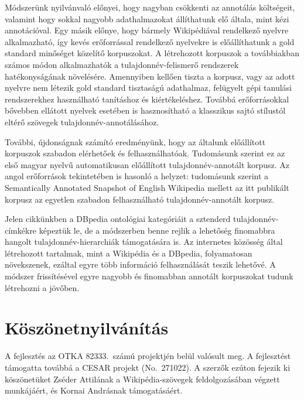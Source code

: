 \documentclass{llncs}
\begin{document}
Módszerünk nyilvánvaló előnyei, hogy nagyban csökkenti az annotálás költségeit, valamint hogy sokkal nagyobb adathalmazokat állíthatunk elő általa, mint kézi annotációval. Egy másik előnye, hogy bármely Wikipédiával rendelkező nyelvre alkalmazható, így kevés erőforrással rendelkező nyelvekre is előállíthatunk a gold standard minőséget közelítő korpuszokat. A létrehozott korpuszok a továbbiakban számos módon alkalmazhatók a tulajdonnév-felismerő rendszerek hatékonyságának növelésére. Amennyiben kellően tiszta a korpusz, vagy az adott nyelvre nem létezik gold standard tisztaságú adathalmaz, felügyelt gépi tanulási rendszerekhez használható tanításhoz és kiértékeléshez. Továbbá erőforrásokkal bővebben ellátott nyelvek esetében is hasznosítható a klasszikus sajtó stílustól eltérő szövegek tulajdonnév-annotálásához. 

További, újdonságnak számító eredményünk, hogy az általunk előállított korpuszok szabadon elérhetőek és felhasználhatóak. Tudomásunk szerint ez az első magyar nyelvű automatikusan előállított tulajdonnév-annotált korpusz. Az angol erőforrások tekintetében is hasonló a helyzet: tudomásunk szerint a Semantically Annotated Snapshot of English Wikipedia \cite{Atserias:08} mellett az itt publikált korpusz az egyetlen szabadon felhasználható tulajdonnév-annotált korpusz. 

Jelen cikkünkben a DBpedia ontológiai kategóriáit a sztenderd tulajdonnév-címkékre képeztük le, de a módszerben benne rejlik a lehetőség finomabbra hangolt tulajdonnév-hierarchiák támogatására is. Az internetes közösség által létrehozott tartalmak, mint a Wikipédia és a DBpedia, folyamatosan növekszenek, ezáltal egyre több információ felhasználását teszik lehetővé. A módszer frissítésével egyre nagyobb és finomabban annotált korpuszokat tudunk létrehozni a jövőben.  

\section*{Köszönetnyilvánítás}
A fejlesztés az OTKA 82333.~számú projektjén belül valósult meg. A fejlesztést támogatta továbbá a CESAR projekt (No.~271022). A szerzők ezúton fejezik ki köszönetüket Zséder Attilának a Wikipédia-szövegek feldolgozásában végzett munkájáért, és Kornai Andrásnak támogatásáért. 



\end{document}
